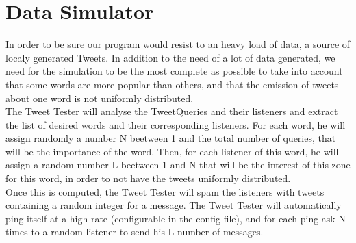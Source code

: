 \section{Data Simulator}
In order to be sure our program would resist to an heavy load of data, a source of localy generated Tweets. In addition to the need of a lot of data generated, we need for the simulation to be the most complete as possible to take into account that some words are more popular than others, 
and that the emission of tweets about one word is not uniformly distributed. \\
The Tweet Tester will analyse the TweetQueries and their listeners and extract the list of desired words and their corresponding listeners. For each word, he will assign randomly a number N beetween 1 and the total number of queries, that will be the importance of the word. Then, for each listener of this word, he will assign a random number L beetween 1 and N that will be the interest of this zone for this word, in order to not have the tweets uniformly distributed.\\
Once this is computed, the Tweet Tester will spam the listeners with tweets containing a random integer for a message. The Tweet Tester will automatically ping itself at a high rate (configurable in the config file), and for each ping ask N times to a random listener to send his L number of messages.
